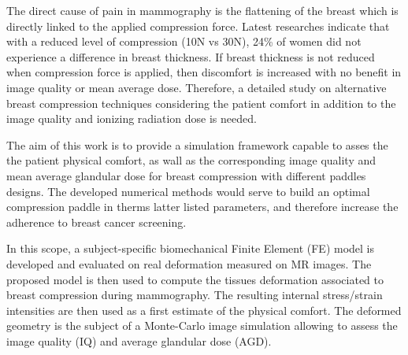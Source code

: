 The direct cause of pain in mammography is the flattening of the breast which is directly linked to the applied compression force. Latest researches indicate that with a reduced level of compression (10N vs 30N), 24\% of women did not experience a difference in breast thickness. If breast thickness is not reduced when compression force is applied, then discomfort is increased with no benefit in image quality or mean average dose. Therefore, a detailed  study on alternative breast compression techniques considering the patient comfort in addition to the image quality and ionizing radiation dose is needed.

The aim of this work is to provide a simulation framework capable to asses the  the patient physical comfort, as wall as the corresponding image quality and mean average glandular dose for breast compression with different paddles designs. The developed numerical methods would serve to build an optimal compression paddle in therms latter listed parameters, and therefore increase the adherence to breast cancer screening. 

In this scope, a subject-specific biomechanical Finite Element (FE) model is developed and evaluated on real deformation measured on MR images. The proposed model is then used to compute the tissues deformation associated to breast compression during mammography.  The resulting internal stress/strain intensities are then used as a first estimate of the physical comfort. The deformed geometry is the subject of a Monte-Carlo image simulation allowing to assess the image quality (IQ) and average glandular dose (AGD).



